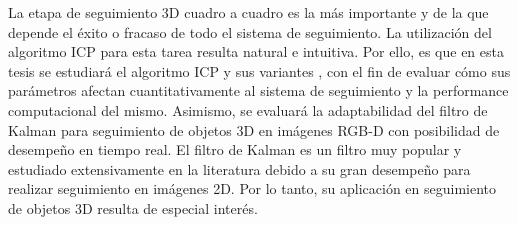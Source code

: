 La etapa de seguimiento 3D cuadro a cuadro es la más importante y de la que depende el éxito o fracaso de todo el sistema de seguimiento. La utilización del algoritmo ICP \cite{zhang94icp,besl92icp} para esta tarea resulta natural e intuitiva. Por ello, es que en esta tesis se estudiará el algoritmo ICP y sus variantes \cite{estepar2004robust,segal2009generalized}, con el fin de evaluar cómo sus parámetros afectan cuantitativamente al sistema de seguimiento y la performance computacional del mismo. Asimismo, se evaluará la adaptabilidad del filtro de Kalman \cite{welch1995introduction} para seguimiento de objetos 3D en imágenes RGB-D con posibilidad de desempeño en tiempo real. El filtro de Kalman es un filtro muy popular y estudiado extensivamente en la literatura \cite{julier1997new,wan2000unscented} debido a su gran desempeño para realizar seguimiento en imágenes 2D. Por lo tanto, su aplicación en seguimiento de objetos 3D resulta de especial interés.
